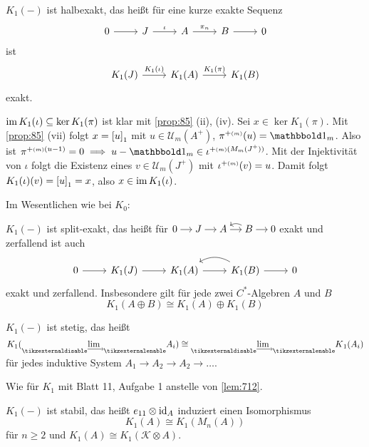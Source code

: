 \begin{proposition}
	$K_1(-)$ ist halbexakt, das heißt für eine kurze exakte Sequenz
	\[
		\begin{tikzcd}
			0 \rar & J \rar["\iota"] & A \rar["\pi_n"] & B \rar & 0
		\end{tikzcd}
	\]
	ist 
	\[
		\begin{tikzcd}
			K_1(J) \rar["K_1(\iota)"] & K_1(A) \rar["K_1(\pi)"] & K_1(B)
		\end{tikzcd}
	\]
	exakt.
\end{proposition}
\begin{beweis}
	$\im K_1(\iota) \subseteq \ker K_1(\pi)$ ist klar mit \autoref{prop:85} (ii), (iv).
	Sei $x \in \ker K_1(\pi)$.
	Mit \autoref{prop:85} (vii) folgt $x=\benbrace*{u}_1$ mit $u \in \mathcal{U}_m(A^+)$, $\pi^{+ \ssbrace{m}}(u)=\ind_m$.
	Also ist $\pi^{+\ssbrace{m}(u-1)}=0 \implies u - \ind_m \in \iota^{+\ssbrace{m}(M_m(J^+))}$.
	Mit der Injektivität von $\iota$ folgt die Existenz eines $v \in \mathcal{U}_m(J^+)$ mit $\iota^{+\ssbrace{m}}(v)=u$.
	Damit folgt $K_1(\iota)(v) = \benbrace*{u}_1= x$, also $x \in \im K_1(\iota)$.
\end{beweis}

Im Wesentlichen wie bei $K_0$:

\begin{proposition}
	$K_1(-)$ ist split-exakt, das heißt für \(
		\begin{tikzcd}[cramped,sep=small]
			0 \rar & J \rar & A \rar & B \lar[bend right] \rar & 0
		\end{tikzcd}
	\)
	exakt und zerfallend ist auch
	\[
		\begin{tikzcd}
			0 \rar & K_1(J) \rar & K_1(A) \rar & K_1(B) \lar[bend right] \rar & 0
		\end{tikzcd}
	\]
	exakt und zerfallend.
	Insbesondere gilt für jede zwei $C^*$-Algebren $A$ und $B$
	\[
		K_1(A \oplus B) \cong K_1(A) \oplus K_1(B)
	\]
\end{proposition}

\begin{proposition}
	$K_1(-)$ ist stetig, das heißt
	\[
		K_1 \enbrace*{\Dlim A_i} \cong \Dlim K_1(A_i)
	\]
	für jedes induktive System $A_1 \to A_2 \to A_2 \to \ldots $.
\end{proposition}
\begin{beweis}
	Wie für $K_1$ mit Blatt 11, Aufgabe 1 anstelle von \autoref{lem:712}.
\end{beweis}

\begin{proposition}
	$K_1(-)$ ist stabil, das heißt $e_{11} \otimes {\id_A}$ induziert einen Isomorphismus
	\[
		K_1(A) \cong K_1(M_n(A))
	\]
	für $n \ge 2$ und $K_1(A) \cong K_1(\mathcal{K} \otimes A)$.
\end{proposition}
\newpage

